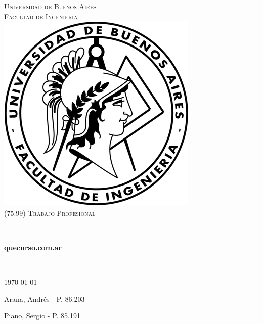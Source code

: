 \documentclass[a4paper,11pt]{article}
\begin{document}

\thispagestyle{empty}

\begin{titlepage}

\newcommand{\HRule}{\rule{\linewidth}{0.5mm}}
\newenvironment{bottompar}{\par\vspace*{\fill}}{\clearpage}

\center

\textsc{\LARGE Universidad de Buenos Aires}\\[0.5cm]
\textsc{\Large Facultad de Ingeniería}\\[1.5cm]

\includegraphics[scale=0.5]{logo.png}\\[1cm]


\textsc{\large (75.99) Trabajo Profesional}\\[0.25cm]
\HRule \\[0.4cm]
{\huge \bfseries quecurso.com.ar}\\[0.4cm]
\HRule \\[0.5cm]

{\large \today}

\begin{bottompar}
\flushleft
Arana, Andrés          - P. 86.203

Piano, Sergio          - P. 85.191
\end{bottompar}

\end{titlepage}
\end{document}
